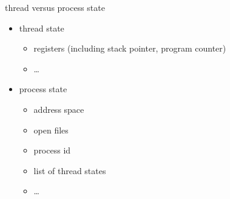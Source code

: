 \usetikzlibrary{matrix}
\begin{frame}{thread versus process state} 
\begin{itemize}
\item thread state 
    \begin{itemize}
    \item registers (including stack pointer, program counter)
    \item \ldots
    \end{itemize}
\item process state
    \begin{itemize}
    \item address space
    \item open files
    \item process id
    \item list of thread states
    \item \ldots
    \end{itemize}
\end{itemize}
\end{frame}

